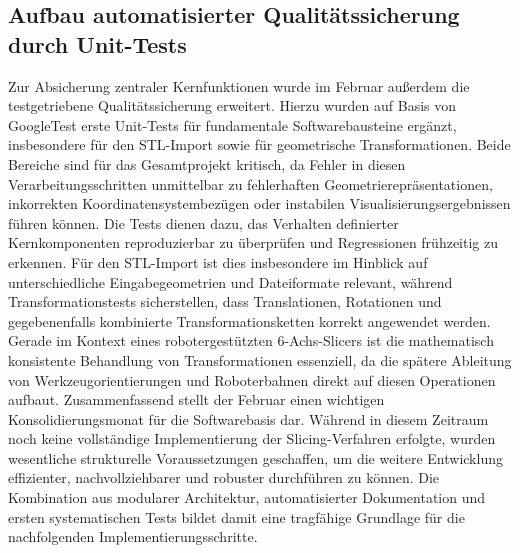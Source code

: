 \documentclass[
	paper=a4,
	fontsize=11pt,
	parskip=half,
	headings=normal,
	bibliography=totoc,
	listof=totoc
]{scrartcl}
\begin{document}
\subsection{Aufbau automatisierter Qualitätssicherung durch Unit-Tests}
	Zur Absicherung zentraler Kernfunktionen wurde im Februar außerdem die testgetriebene Qualitätssicherung erweitert.
	Hierzu wurden auf Basis von GoogleTest erste Unit-Tests für fundamentale Softwarebausteine ergänzt, insbesondere für den STL-Import sowie für geometrische Transformationen.
	Beide Bereiche sind für das Gesamtprojekt kritisch, da Fehler in diesen Verarbeitungsschritten unmittelbar zu fehlerhaften Geometrierepräsentationen, inkorrekten Koordinatensystembezügen oder instabilen Visualisierungsergebnissen führen können.
	Die Tests dienen dazu, das Verhalten definierter Kernkomponenten reproduzierbar zu überprüfen und Regressionen frühzeitig zu erkennen.
	Für den STL-Import ist dies insbesondere im Hinblick auf unterschiedliche Eingabegeometrien und Dateiformate relevant, während Transformationstests sicherstellen, dass Translationen, Rotationen und gegebenenfalls kombinierte Transformationsketten korrekt angewendet werden.
	Gerade im Kontext eines robotergestützten 6-Achs-Slicers ist die mathematisch konsistente Behandlung von Transformationen essenziell, da die spätere Ableitung von Werkzeugorientierungen und Roboterbahnen direkt auf diesen Operationen aufbaut.
	Zusammenfassend stellt der Februar einen wichtigen Konsolidierungsmonat für die Softwarebasis dar.
	Während in diesem Zeitraum noch keine vollständige Implementierung der Slicing-Verfahren erfolgte, wurden wesentliche strukturelle Voraussetzungen geschaffen, um die weitere Entwicklung effizienter, nachvollziehbarer und robuster durchführen zu können.
	Die Kombination aus modularer Architektur, automatisierter Dokumentation und ersten systematischen Tests bildet damit eine tragfähige Grundlage für die nachfolgenden Implementierungsschritte.
\end{document}
